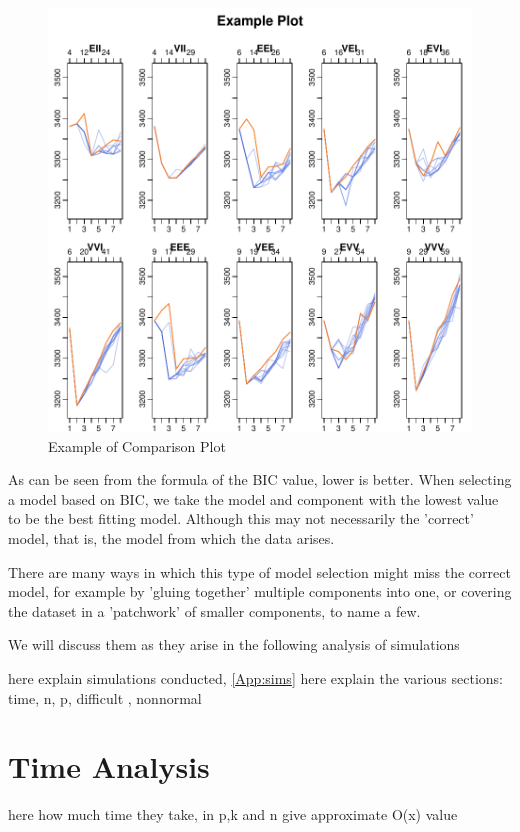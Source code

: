 \begin{figure}
    \centering
\includegraphics{chapter3-bicplotdemoplot}
    \caption{Example of Comparison Plot}
    \label{fig:ExPlot}
\end{figure}

As can be seen from the formula of the BIC value, lower is better. When 
selecting a model based on BIC, we take the model and component with the 
lowest value to be the best fitting model. Although this may not necessarily
the 'correct' model, that is, the model from which the data arises.

There are many ways in which this type of model selection might miss the 
correct model, for example by 'gluing together' multiple components into one,
or covering the dataset in a 'patchwork' of smaller components, to name a few.

We will discuss them as they arise in the following analysis of simulations

here explain simulations conducted, \ref{App:sims}
here explain the various sections: time, n, p, difficult , nonnormal 

\section{Time Analysis}

here how much time they take, in p,k and n give approximate O(x) value


